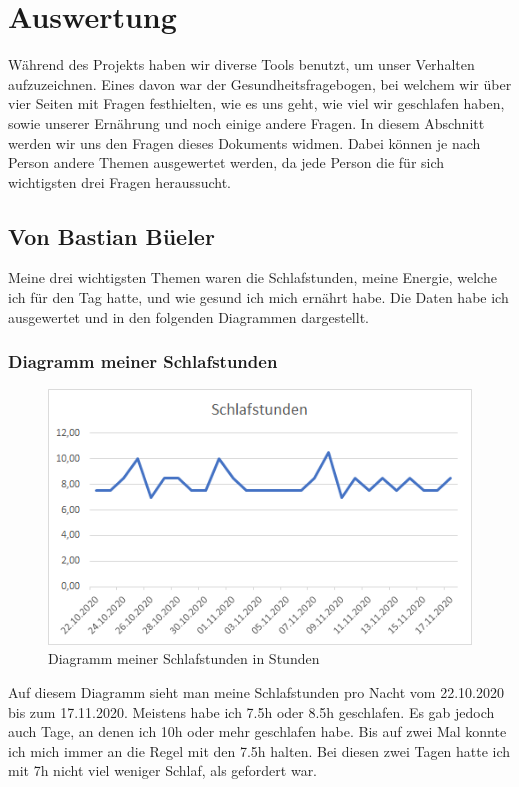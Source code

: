 \section{Auswertung}
\authortoc{\bastian}{\sectionident}
Während des Projekts haben wir diverse Tools benutzt, um unser Verhalten aufzuzeichnen. Eines davon war der Gesundheitsfragebogen, bei welchem wir über vier Seiten mit Fragen festhielten, wie es uns geht, wie viel wir geschlafen haben, sowie unserer Ernährung und noch einige andere Fragen. In diesem Abschnitt werden wir uns den Fragen dieses Dokuments widmen. Dabei können je nach Person andere Themen ausgewertet werden, da jede Person die für sich wichtigsten drei Fragen heraussucht.
\subsection{Von Bastian Büeler}
\authortoc{\bastian}{\subsectionident}
Meine drei wichtigsten Themen waren die Schlafstunden, meine Energie, welche ich für den Tag hatte, und wie gesund ich mich ernährt habe.
Die Daten habe ich ausgewertet und in den folgenden Diagrammen dargestellt.
\pagebreak
\subsubsection{Diagramm meiner Schlafstunden}
\begin{figure}[H]
  \centering
  \includegraphics[width=0.7\linewidth]{./images/bastian_schlaf.png}
  \caption{Diagramm meiner Schlafstunden in Stunden}
\end{figure}
Auf diesem Diagramm sieht man meine Schlafstunden pro Nacht vom 22.10.2020 bis zum 17.11.2020. Meistens habe ich 7.5h oder 8.5h geschlafen. Es gab jedoch auch Tage, an denen ich 10h oder mehr geschlafen habe. Bis auf zwei Mal konnte ich mich immer an die Regel mit den 7.5h halten. Bei diesen zwei Tagen hatte ich mit 7h nicht viel weniger Schlaf, als gefordert war.
\pagebreak

